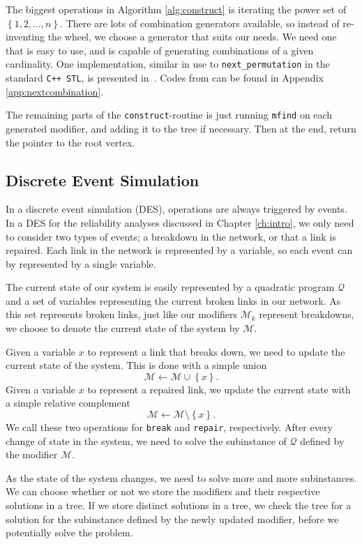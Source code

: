 The biggest operations in Algorithm \ref{alg:construct} is iterating the power
set of $\left\{1,2,\ldots,n\right\}$. There are lots of combination generators available, so
instead of re-inventing the wheel, we choose a generator that suits our needs.
We need one that is easy to use, and is capable of generating combinations of
a given cardinality. One implementation, similar in use to
\texttt{next\_permutation} in the standard \texttt{C++ STL}, is presented
in~\cite{codeproject}.
Codes from \cite{codeproject} can be found in Appendix
\ref{app:nextcombination}.

The remaining parts of the \texttt{construct}-routine is just running
\texttt{mfind} on each generated modifier, and adding it to the tree
if necessary. Then at the end, return the pointer to the root vertex.

\subsection{Discrete Event Simulation}
In a discrete event simulation (DES), operations are always triggered by events.
In a DES for the reliability analyses discussed in Chapter \ref{ch:intro},
we only need to consider two types of events; a breakdown in the network,
or that a link is repaired.
Each link in the network is represented by
a variable, so each event can by represented by a single variable.

The current state of our system is easily represented by a quadratic program 
$\mathcal{Q}$ and a set of variables representing the current broken links in
our network.
As this set represents broken links, just like our modifiers $\mathcal{M}_k$
represent breakdowns, we choose to denote the current state of the system
by $\mathcal{M}$. 

Given a variable $x$ to represent a link that breaks down, we need to
update the  current state of the system. This is done with a simple
union
\[
\mathcal{M} \leftarrow \mathcal{M} \cup \left\{x\right\}.
\]
Given a variable $x$ to represent a repaired link, we update the
current state with a simple relative complement
\[
\mathcal{M} \leftarrow \mathcal{M} \setminus \left\{x\right\}.
\]
We call these two operations for \texttt{break} and \texttt{repair}, respectively.
After every change of state in the system, we need to solve the subinstance
of $\mathcal{Q}$ defined by the modifier $\mathcal{M}$.

As the state of the system changes, we need to solve more and more subinstances.
We can choose whether or not we store the modifiers and their respective
solutions in a tree. If we store distinct solutions in a tree,
we check the tree for a solution for the subinstance defined by the newly
updated modifier, before we potentially solve the problem.
